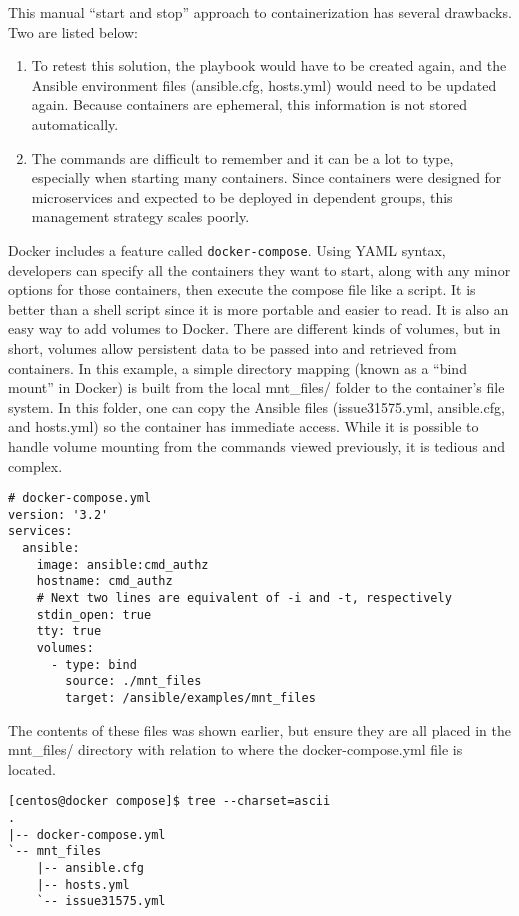 This manual ``start and stop'' approach to containerization has several
drawbacks. Two are listed below:
\begin{enumerate}
  \item	To retest this solution, the playbook would have to be created again,
  and the Ansible environment files (ansible.cfg, hosts.yml) would need to be
  updated again. Because containers are ephemeral, this information is not
  stored automatically.
  \item	The commands are difficult to remember and it can be a lot to type,
  especially when starting many containers. Since containers were designed for
  microservices and expected to be deployed in dependent groups, this
  management strategy scales poorly.
\end{enumerate}
  
Docker includes a feature called \verb|docker-compose|. Using YAML syntax,
developers can specify all the containers they want to start, along with any minor
options for those containers, then execute the compose file like a script. It
is better than a shell script since it is more portable and easier to read. It
is also an easy way to add volumes to Docker. There are different kinds of
volumes, but in short, volumes allow persistent data to be passed into and
retrieved from containers. In this example, a simple directory mapping (known
as a ``bind mount'' in Docker) is built from the local mnt\_files/ folder to the
container's file system. In this folder, one can copy the Ansible files
(issue31575.yml, ansible.cfg, and hosts.yml) so the container has immediate
access. While it is possible to handle volume mounting from the commands
viewed previously, it is tedious and complex.

\begin{verbatim}
# docker-compose.yml 
version: '3.2'
services:
  ansible:
    image: ansible:cmd_authz
    hostname: cmd_authz
    # Next two lines are equivalent of -i and -t, respectively
    stdin_open: true
    tty: true
    volumes:
      - type: bind
        source: ./mnt_files
        target: /ansible/examples/mnt_files
\end{verbatim}

The contents of these files was shown earlier, but ensure they are all placed
in the mnt\_files/ directory with relation to where the docker-compose.yml file
is located.

\begin{verbatim}
[centos@docker compose]$ tree --charset=ascii
.
|-- docker-compose.yml
`-- mnt_files
    |-- ansible.cfg
    |-- hosts.yml
    `-- issue31575.yml
\end{verbatim}

